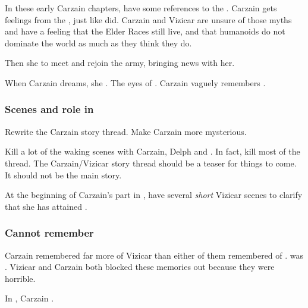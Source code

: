 In these early Carzain chapters, have some references to the . 
Carzain gets  feelings from the , just like  did. 
Carzain and Vizicar are unsure of those myths and have a feeling that the Elder Races still live, and that humanoids do not dominate the world as much as they think they do. 

Then she  to meet  and rejoin the army, bringing news with her. 

When Carzain dreams, she . 
The eyes of \Nexagglachel. 
Carzain vaguely remembers . 






\subsubsection{Scenes and role in \TwilightAngelRememberEmph}
Rewrite the Carzain story thread. 
Make Carzain more mysterious. 

Kill a lot of the waking scenes with Carzain, Delph and \Tsekkect. 
In fact, kill most of the thread. 
The Carzain/Vizicar story thread should be a teaser for things to come.
It should not be the main story. 

At the beginning of Carzain's part in \TwilightAngelRememberEmph, have several \emph{short} Vizicar scenes to clarify that she has attained \kenosis. 







\subsubsection{Cannot remember \Tydesmos}
Carzain remembered far more of Vizicar than either of them remembered of \Tydesmos. 
\Tydesmos was .
Vizicar and Carzain both blocked these memories out because they were horrible. 

In \emph{\CarzainWithRedcorBook{}}, Carzain . 





